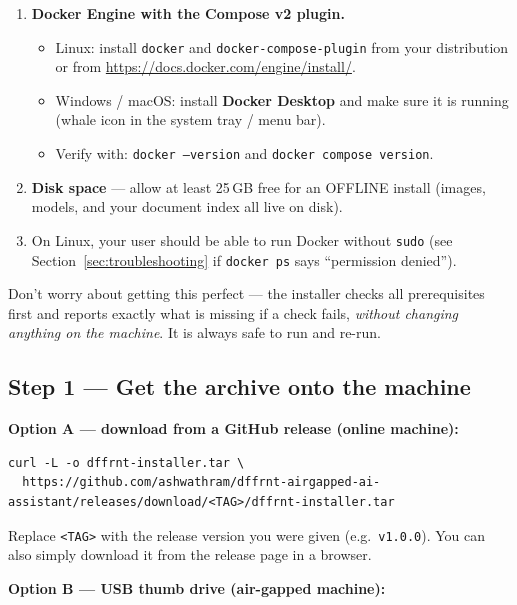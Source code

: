 \documentclass[11pt,letterpaper]{article}
\begin{document}
\begin{enumerate}
  \item \textbf{Docker Engine with the Compose v2 plugin.}
    \begin{itemize}
      \item Linux: install \texttt{docker} and
            \texttt{docker-compose-plugin} from your distribution or from
            \url{https://docs.docker.com/engine/install/}.
      \item Windows / macOS: install \textbf{Docker Desktop} and make sure it
            is running (whale icon in the system tray / menu bar).
      \item Verify with: \texttt{docker --version} and
            \texttt{docker compose version}.
    \end{itemize}
  \item \textbf{Disk space} --- allow at least 25\,GB free for an OFFLINE
        install (images, models, and your document index all live on disk).
  \item On Linux, your user should be able to run Docker without
        \texttt{sudo} (see Section~\ref{sec:troubleshooting} if
        \texttt{docker ps} says ``permission denied'').
\end{enumerate}

\begin{gtip}
Don't worry about getting this perfect --- the installer checks all
prerequisites first and reports exactly what is missing if a check fails,
\emph{without changing anything on the machine}. It is always safe to run and
re-run.
\end{gtip}

\subsection{Step 1 --- Get the archive onto the machine}

\textbf{Option A --- download from a GitHub release (online machine):}

\begin{lstlisting}
curl -L -o dffrnt-installer.tar \
  https://github.com/ashwathram/dffrnt-airgapped-ai-assistant/releases/download/<TAG>/dffrnt-installer.tar
\end{lstlisting}

Replace \texttt{<TAG>} with the release version you were given (e.g.\
\texttt{v1.0.0}). You can also simply download it from the release page in a
browser.

\textbf{Option B --- USB thumb drive (air-gapped machine):}
\end{document}
